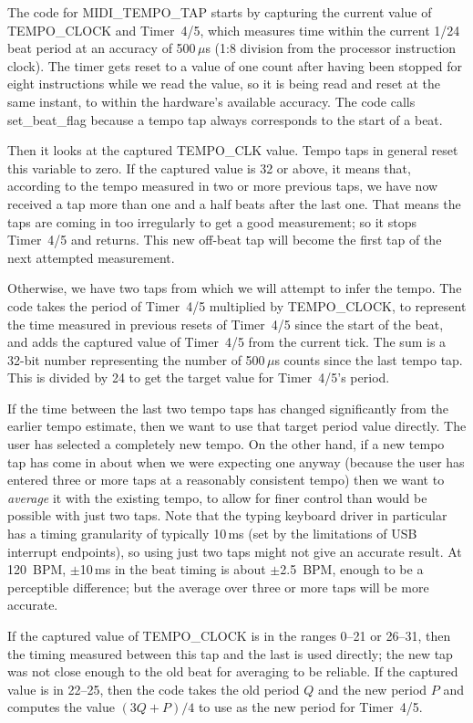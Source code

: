 The code for MIDI\_TEMPO\_TAP starts by capturing the current value of
TEMPO\_CLOCK and Timer~4/5, which measures time within the current 1/24 beat
period at an accuracy of 500\,$\mu$s (1:8 division from the processor
instruction clock).  The timer gets reset to a value of one count after having
been stopped for eight instructions while we read the value, so it is being
read and reset at the same instant, to within the hardware's available
accuracy.  The code calls set\_beat\_flag because a tempo tap always
corresponds to the start of a beat.

Then it looks at the captured TEMPO\_CLK value.  Tempo taps in general reset
this variable to zero.  If the captured value is 32 or above, it means that,
according to the tempo measured in two or more previous taps, we have
now received a tap more than one and a half beats after the last one.  That
means the taps are coming in too irregularly to get a good measurement; so
it stops Timer~4/5 and returns.  This new off-beat tap will become the first
tap of the next attempted measurement.

Otherwise, we have two taps from which we will attempt to infer the tempo. 
The code takes the period of Timer~4/5 multiplied by TEMPO\_CLOCK, to
represent the time measured in previous resets of Timer~4/5 since the start
of the beat, and adds the captured value of Timer~4/5 from the current tick. 
The sum is a 32-bit number representing the number of 500\,$\mu$s counts
since the last tempo tap.  This is divided by 24 to get the target value for
Timer~4/5's period.

If the time between the last two tempo taps has changed significantly from
the earlier tempo estimate, then we want to use that target period value
directly.  The user has selected a completely new tempo.  On the other hand,
if a new tempo tap has come in about when we were expecting one anyway
(because the user has entered three or more taps at a reasonably consistent
tempo) then we want to \emph{average} it with the existing tempo, to allow
for finer control than would be possible with just two taps.  Note that the
typing keyboard driver in particular has a timing granularity of typically
10\,ms (set by the limitations of USB interrupt endpoints), so using just
two taps might not give an accurate result.  At 120~BPM, $\pm$10\,ms in the
beat timing is about $\pm$2.5~BPM, enough to be a perceptible difference;
but the average over three or more taps will be more accurate.

If the captured value of TEMPO\_CLOCK is in the ranges 0--21 or 26--31,
then the timing measured between this tap and the last is used directly; the
new tap was not close enough to the old beat for averaging to be reliable. 
If the captured value is in 22--25, then the code takes the old period $Q$
and the new period $P$ and computes the value $(3Q+P)/4$ to use as the new
period for Timer~4/5.


